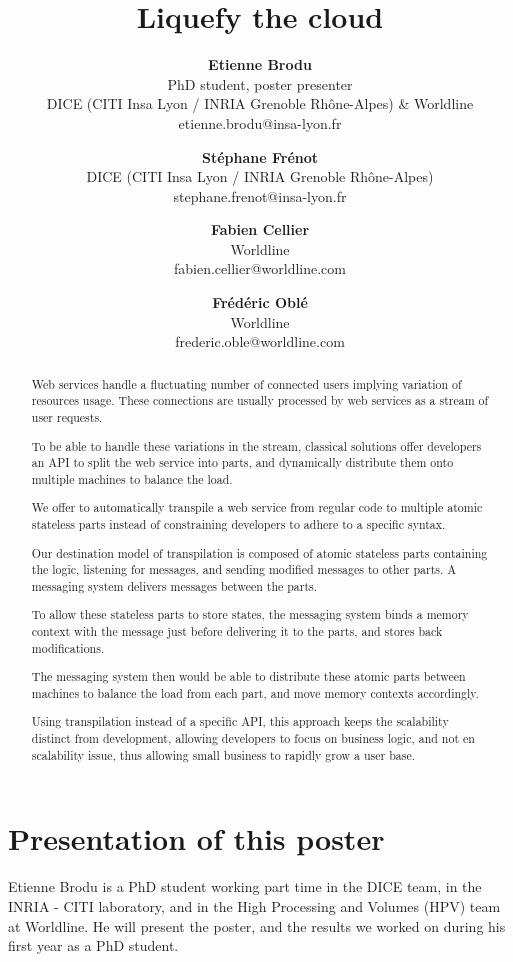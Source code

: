 \documentclass[11pt,twocolumn]{article}
\begin{document}
\begin{multicols}{4}
\title{\textbf{Liquefy the cloud}}
\author{
    \textbf{Etienne Brodu}\\
    PhD student, poster presenter\\
    DICE (CITI Insa Lyon / INRIA Grenoble Rhône-Alpes) \& Worldline\\
    etienne.brodu@insa-lyon.fr
  \and
    \textbf{Stéphane Frénot}\\
    DICE (CITI Insa Lyon / INRIA Grenoble Rhône-Alpes)\\
    stephane.frenot@insa-lyon.fr
  \and
    \textbf{Fabien Cellier}\\
    Worldline\\
    fabien.cellier@worldline.com
  \and
    \textbf{Frédéric Oblé}\\
    Worldline\\
    frederic.oble@worldline.com
}
\date{}
\maketitle
\end{multicols}

\maketitle

\begin{abstract}
Web services handle a fluctuating number of connected users implying variation of resources usage.
These connections are usually processed by web services as a stream of user requests.

To be able to handle these variations in the stream, classical solutions offer developers an API to split the web service into parts, and dynamically distribute them onto multiple machines to balance the load.

We offer to automatically transpile a web service from regular code to multiple atomic stateless parts instead of constraining developers to adhere to a specific syntax.

Our destination model of transpilation is composed of atomic stateless parts containing the logic, listening for messages, and sending modified messages to other parts.
A messaging system delivers messages between the parts.

To allow these stateless parts to store states, the messaging system binds a memory context with the message just before delivering it to the parts, and stores back modifications.

The messaging system then would be able to distribute these atomic parts between machines to balance the load from each part, and move memory contexts accordingly.

Using transpilation instead of a specific API, this approach keeps the scalability distinct from development, allowing developers to focus on business logic, and not en scalability issue, thus allowing small business to rapidly grow a user base.
\end{abstract}

\section*{Presentation of this poster}
Etienne Brodu is a PhD student working part time in the DICE team, in the INRIA - CITI laboratory, and in the High Processing and Volumes (HPV) team at Worldline.
He will present the poster, and the results we worked on during his first year as a PhD student.
\end{document}
